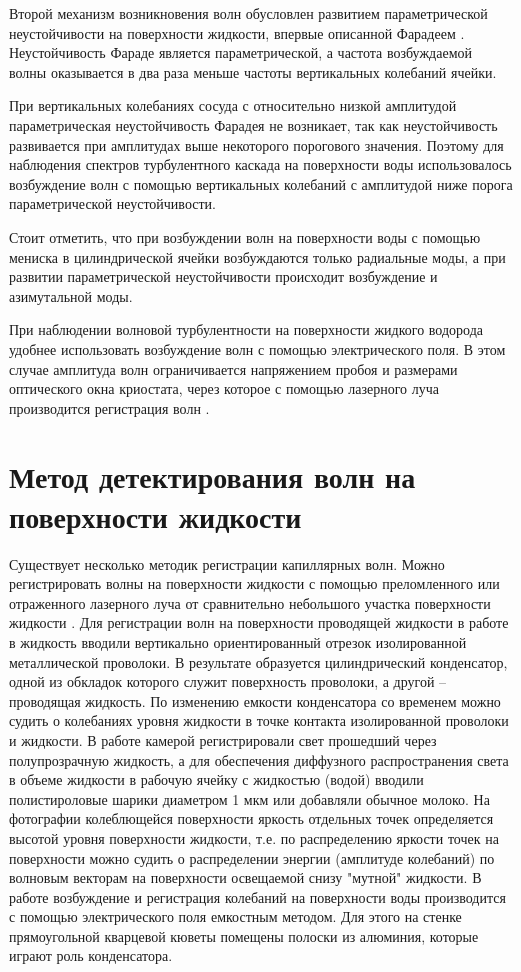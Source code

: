 Второй механизм возникновения волн обусловлен развитием параметрической неустойчивости на поверхности жидкости, впервые описанной Фарадеем \cite{Faraday1831}. Неустойчивость Фараде является параметрической, а частота возбуждаемой волны оказывается в два раза меньше частоты вертикальных колебаний ячейки. 

При вертикальных колебаниях сосуда с относительно низкой амплитудой параметрическая неустойчивость Фарадея не возникает, так как неустойчивость развивается при амплитудах выше некоторого порогового значения. Поэтому для наблюдения спектров турбулентного каскада на поверхности воды использовалось возбуждение волн с помощью вертикальных колебаний с амплитудой ниже порога параметрической неустойчивости. 

Стоит отметить, что при возбуждении волн на поверхности воды с помощью мениска в цилиндрической ячейки возбуждаются только радиальные моды, а при развитии параметрической неустойчивости происходит возбуждение и азимутальной моды.



При наблюдении волновой турбулентности на поверхности жидкого водорода удобнее использовать возбуждение волн с помощью электрического поля. В этом случае амплитуда волн ограничивается напряжением пробоя и размерами оптического окна криостата, через которое с помощью лазерного луча производится регистрация волн \cite{Brazhnikov2002}.


\section{Метод детектирования волн на поверхности жидкости}\label{p1_methodDetect}

Существует несколько методик регистрации капиллярных волн. Можно регистрировать волны на поверхности жидкости с помощью преломленного или отраженного лазерного луча от сравнительно небольшого участка поверхности жидкости \cite{Brazhnikov_IET}. Для регистрации волн на поверхности проводящей жидкости в работе \cite{Falcon2007} в жидкость вводили вертикально ориентированный отрезок изолированной металлической проволоки. В результате образуется цилиндрический конденсатор, одной из обкладок которого служит поверхность проволоки, а другой – проводящая жидкость. По изменению емкости конденсатора со временем можно судить о колебаниях уровня жидкости в точке контакта изолированной проволоки и жидкости.
В работе \cite{Wright1996, Henry2000} камерой регистрировали свет прошедший через полупрозрачную жидкость, а для обеспечения диффузного распространения света в объеме жидкости в рабочую ячейку с жидкостью (водой) вводили полистироловые шарики диаметром 1 мкм или добавляли обычное молоко. На фотографии колеблющейся поверхности яркость отдельных точек определяется высотой уровня поверхности жидкости, т.е. по распределению яркости точек на поверхности можно судить о распределении энергии (амплитуде колебаний) по волновым векторам на поверхности освещаемой снизу "мутной" жидкости. В работе \cite{Fujimura2008} возбуждение и регистрация колебаний на поверхности воды производится с помощью электрического поля емкостным методом. Для этого на стенке прямоугольной кварцевой кюветы помещены полоски из алюминия, которые играют роль конденсатора.

